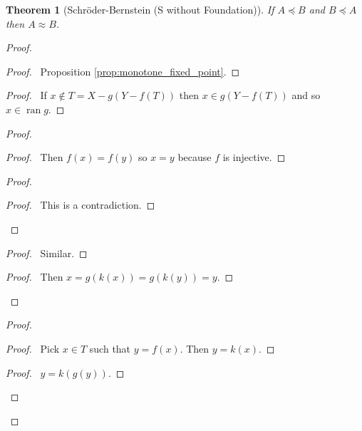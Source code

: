 \documentclass{book}
\let\qed\relax
\newtheorem{thm}[ax]{Theorem}
\theoremstyle{definition}
\newcommand{\ran}{\ensuremath{\operatorname{ran}}}
\begin{document}
\begin{thm}[Schr\"{o}der-Bernstein (S without Foundation)]
If $A \preccurlyeq B$ and $B \preccurlyeq A$ then $A \approx B$.
\end{thm}

\begin{proof}
\pf
{}
\begin{proof}
	\pf\ Proposition \ref{prop:monotone_fixed_point}.
\end{proof}
\begin{proof}
	\pf\ If $x \notin T = X - g(Y - f(T))$ then $x \in g(Y - f(T))$ and so $x \in \ran g$.
\end{proof}
\begin{proof}
	\begin{proof}
		\pf\ Then $f(x) = f(y)$ so $x = y$ because $f$ is injective.
	\end{proof}
	\begin{proof}
		\qedstep
		\begin{proof}
			\pf\ This is a contradiction.
		\end{proof}
	\end{proof}
	\begin{proof}
		\pf\ Similar.
	\end{proof}
	\begin{proof}
		\pf\ Then $x = g(k(x)) = g(k(y)) = y$.
	\end{proof}
\end{proof}
\begin{proof}
	\begin{proof}
		\pf\ Pick $x \in T$ such that $y = f(x)$. Then $y = k(x)$.
	\end{proof}
	\begin{proof}
		\pf\ $y = k(g(y))$.
	\end{proof}
\end{proof}
\qed
\end{proof}
\end{document}
